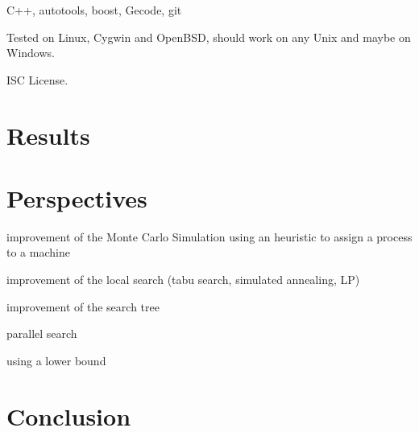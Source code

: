 \documentclass[a4paper,twocolumn]{article}
\begin{document}
C++, autotools, boost, Gecode, git

Tested on Linux, Cygwin and OpenBSD, should work on any Unix and maybe
on Windows.

ISC License.

\section{Results}



\section{Perspectives}

improvement of the Monte Carlo Simulation using an heuristic to assign
a process to a machine

improvement of the local search (tabu search, simulated annealing, LP)

improvement of the search tree

parallel search

using a lower bound

\section{Conclusion}


\end{document}
